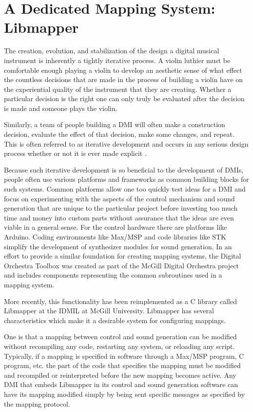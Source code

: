 \section{A Dedicated Mapping System: Libmapper}

The creation, evolution, and stabilization of the design a digital musical instrument is inherently a tightly iterative process. A violin luthier must be comfortable enough playing a violin to develop an aesthetic sense of what effect the countless decisions that are made in the process of building a violin have on the experiential quality of the instrument that they are creating. Whether a particular decision is the right one can only truly be evaluated after the decision is made and someone plays the violin. 

Similarly, a team of people building a DMI will often make a construction decision, evaluate the effect of that decision, make some changes, and repeat. This is often referred to as iterative development and occurs in any serious design process whether or not it is ever made explicit \cite{iterative2003}. 

Because such iterative development is so beneficial to the development of DMIs, people often use various platforms and frameworks as common building blocks for such systems. Common platforms allow one too quickly test ideas for a DMI and focus on experimenting with the aspects of the control mechanism and sound generation that are unique to the particular project before investing too much time and money into custom parts without assurance that the ideas are even viable in a general sense. For the control hardware there are platforms like Arduino. Coding environments like Max/MSP and code libraries like STK simplify the development of synthesizer modules for sound generation. In an effort to provide a similar foundation for creating mapping systems, the Digital Orchestra Toolbox was created as part of the McGill Digital Orchestra project and includes components representing the common subroutines used in a mapping system. 

More recently, this functionality has been reimplemented as a C library called Libmapper at the IDMIL at McGill University. Libmapper has several characteristics which make it a desirable system for configuring mappings. 

One is that a mapping between control and sound generation can be modified without recompiling any code, restarting any system, or reloading any script. Typically, if a mapping is specified in software through a Max/MSP program, C program, etc. the part of the code that specifies the mapping must be modified and recompiled or reinterpreted before the new mapping becomes active. Any DMI that embeds Libmapper in its control and sound generation software can have its mapping modified simply by being sent specific messages as specified by the mapping protocol. 

